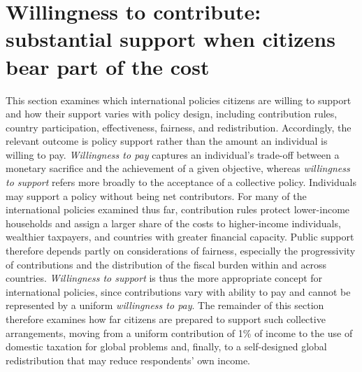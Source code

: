 \documentclass[11pt,a4paper]{article}
\begin{document}
\section{Willingness to contribute: substantial support when citizens bear part of the cost}


This section examines which international policies citizens are willing to support and how their support varies with policy design, including contribution rules, country participation, effectiveness, fairness, and redistribution. Accordingly, the relevant outcome is policy support rather than the amount an individual is willing to pay. \textit{Willingness to pay} captures an individual's trade-off between a monetary sacrifice and the achievement of a given objective, whereas \textit{willingness to support} refers more broadly to the acceptance of a collective policy. Individuals may support a policy without being net contributors. For many of the international policies examined thus far, contribution rules protect lower-income households and assign a larger share of the costs to higher-income individuals, wealthier taxpayers, and countries with greater financial capacity. Public support therefore depends partly on considerations of fairness, especially the progressivity of contributions and the distribution of the fiscal burden within and across countries. \textit{Willingness to support} is thus the more appropriate concept for international policies, since contributions vary with ability to pay and cannot be represented by a uniform \textit{willingness to pay}. The remainder of this section therefore examines how far citizens are prepared to support such collective arrangements, moving from a uniform contribution of 1\% of income to the use of domestic taxation for global problems and, finally, to a self-designed global redistribution that may reduce respondents' own income.

\end{document}
